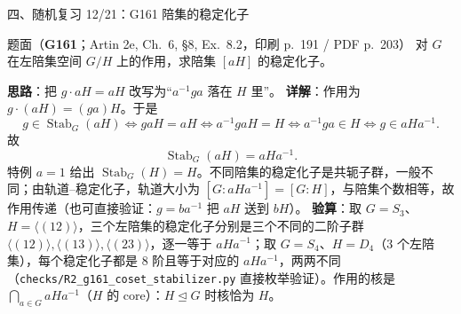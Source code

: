 \documentclass[aspectratio=169,10pt,fontset=none]{ctexbeamer}
\newcommand{\ex}[1]{\textcolor{accent}{\footnotesize\bfseries #1}}
\newcommand{\key}[1]{\textcolor{ink}{\bfseries #1}}
\begin{document}
\begin{frame}[t]{四、随机复习 12/21：G161 陪集的稳定化子}
\label{ex:G161}
\scriptsize
\begin{block}{\footnotesize 题面（\ex{G161}；Artin 2e, Ch.~6, §8, Ex.~8.2，印刷 p.~191 / PDF p.~203）}
对 $G$ 在左陪集空间 $G/H$ 上的作用，求陪集 $[aH]$ 的稳定化子。
\end{block}
\key{思路}：把 $g\cdot aH=aH$ 改写为“$a^{-1}ga$ 落在 $H$ 里”。
\key{详解}：作用为 $g\cdot(aH)=(ga)H$。于是
\[ g\in\operatorname{Stab}_G(aH)\iff gaH=aH\iff a^{-1}gaH=H\iff a^{-1}ga\in H\iff g\in aHa^{-1}. \]
故
\[ \operatorname{Stab}_G(aH)=aHa^{-1}. \]
特例 $a=1$ 给出 $\operatorname{Stab}_G(H)=H$。不同陪集的稳定化子是共轭子群，一般不同；由轨道–稳定化子，轨道大小为 $[G:aHa^{-1}]=[G:H]$，与陪集个数相等，故作用传递（也可直接验证：$g=ba^{-1}$ 把 $aH$ 送到 $bH$）。
\key{验算}：取 $G=S_3$、$H=\langle(12)\rangle$，三个左陪集的稳定化子分别是三个不同的二阶子群 $\langle(12)\rangle,\langle(13)\rangle,\langle(23)\rangle$，逐一等于 $aHa^{-1}$；取 $G=S_4$、$H=D_4$（$3$ 个左陪集），每个稳定化子都是 $8$ 阶且等于对应的 $aHa^{-1}$，两两不同（\texttt{checks/R2\_g161\_coset\_stabilizer.py} 直接枚举验证）。作用的核是 $\bigcap_{a\in G}aHa^{-1}$（$H$ 的 core）：$H\trianglelefteq G$ 时核恰为 $H$。
\end{frame}
\end{document}

